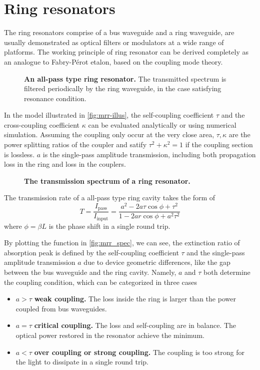 \documentclass[final]{kuee_en}
\begin{document}
\section{Ring resonators}

The ring resonators comprise of a bus waveguide and a ring waveguide, are usually demonstrated as optical filters or modulators at a wide range of platforms. The working principle of ring resonator can be derived completely \cite{Bogaerts2012} as an analogue to Fabry-P\'{e}rot etalon, based on the coupling mode theory. 

\begin{figure}
    \centering
	
	\caption{\textbf{An all-pass type ring resonator.} The transmitted spectrum is filtered periodically by the ring waveguide, in the case satisfying resonance condition.}
    \label{fig:mrr-illus}
\end{figure}

In the model illustrated in \autoref{fig:mrr-illus}, the self-coupling coefficient $\tau$ and the cross-coupling coefficient $\kappa$ can be evaluated analytically or using numerical simulation. Assuming the coupling only occur at the very close area, $\tau,\kappa$ are the power splitting ratios of the coupler and satify $\tau^2 + \kappa^2 =1 $ if the coupling section is lossless. $a$ is the single-pass amplitude transmission, including both propagation loss in the ring and loss in the couplers.

\begin{figure}
    \centering
    
    \caption{\textbf{The transmission spectrum of a ring resonator.} }
    \label{fig:mrr_spec}
\end{figure}

The transmission rate of a all-pass type ring cavity takes the form of
\begin{equation}\label{eq:trans_phi}
    T = \frac{I_\mathrm{pass}}{I_\mathrm{input}} = \frac{a^2 - 2a\tau \cos \phi + \tau^2}{1 - 2ar \cos \phi + a^2 \tau^2}
\end{equation}
where $\phi=\beta L$ is the phase shift in a single round trip. 

By plotting the function in \autoref{fig:mrr_spec}, we can see, the extinction ratio of absorption peak is defined by the self-coupling coefficient $\tau$ and the single-pass amplitude transmission $a$ due to device geometric differences, like the gap between the bus waveguide and the ring cavity. Namely, $a$ and $\tau$ both determine the coupling condition, which can be categorized in three cases
\begin{itemize}
    \item $a>\tau$ \textbf{weak coupling.} The loss inside the ring is larger than the power coupled from bus waveguides.
    \item $a=\tau$ \textbf{critical coupling.} The loss and self-coupling are in balance. The optical power restored in the resonator achieve the minimum.
    \item $a<\tau$ \textbf{over coupling or strong coupling.} The coupling is too strong for the light to dissipate in a single round trip.
\end{itemize}
\end{document}
